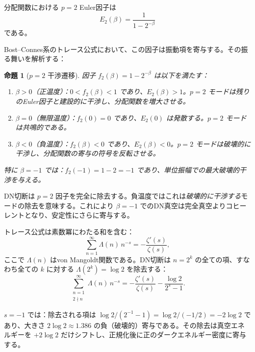 \documentclass[12pt,a4paper]{article}
\newtheorem{proposition}[theorem]{命題}
\begin{document}
分配関数における $p=2$ Euler因子は
\begin{equation}
  E_2(\beta) = \frac{1}{1-2^{-\beta}}
\end{equation}
である。

Bost--Connes系のトレース公式において、この因子は振動項を寄与する。その振る舞いを解析する：

\begin{proposition}[$p=2$ 干渉遷移]\label{prop:interference}
因子 $f_2(\beta) = 1 - 2^{-\beta}$ は以下を満たす：
\begin{enumerate}[label=(\roman*)]
\item $\beta > 0$（正温度）：$0 < f_2(\beta) < 1$ であり、$E_2(\beta) > 1$。$p=2$ モードは残りのEuler因子と\emph{建設的}に干渉し、分配関数を増大させる。
\item $\beta = 0$（無限温度）：$f_2(0) = 0$ であり、$E_2(0)$ は発散する。$p=2$ モードは共鳴的である。
\item $\beta < 0$（負温度）：$f_2(\beta) < 0$ であり、$E_2(\beta) < 0$。$p=2$ モードは\emph{破壊的}に干渉し、分配関数の寄与の符号を反転させる。
\end{enumerate}
特に $\beta = -1$ では：$f_2(-1) = 1 - 2 = -1$ であり、単位振幅での最大破壊的干渉を与える。
\end{proposition}

DN切断は $p=2$ 因子を完全に除去する。負温度ではこれは\emph{破壊的に干渉する}モードの除去を意味する。これにより $\beta = -1$ でのDN真空は完全真空よりコヒーレントとなり、安定性にさらに寄与する。

トレース公式は素数冪にわたる和を含む：
\begin{equation}
  \sum_{n=1}^{\infty}\Lambda(n)\,n^{-s} = -\frac{\zeta'(s)}{\zeta(s)},
\end{equation}
ここで $\Lambda(n)$ はvon Mangoldt関数である。DN切断は $n = 2^k$ の全ての項、すなわち全ての $k$ に対する $\Lambda(2^k) = \log 2$ を除去する：
\begin{equation}
  \sum_{\substack{n=1 \\ 2\nmid n}}^{\infty}\Lambda(n)\,n^{-s} = -\frac{\zeta'(s)}{\zeta(s)} - \frac{\log 2}{2^s - 1}.
\end{equation}

$s = -1$ では：除去される項は $\log 2/(2^{-1}-1) = \log 2/(-1/2) = -2\log 2$ であり、大きさ $2\log 2 \approx 1.386$ の負（破壊的）寄与である。その除去は真空エネルギーを $+2\log 2$ だけシフトし、正規化後に正のダークエネルギー密度に寄与する。

\end{document}
